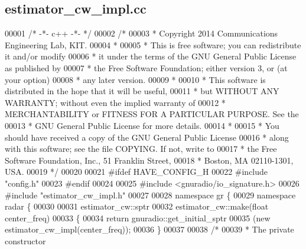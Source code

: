 \subsection{estimator\+\_\+cw\+\_\+impl.\+cc}
\label{estimator__cw__impl_8cc_source}

\begin{DoxyCode}
00001 \textcolor{comment}{/* -*- c++ -*- */}
00002 \textcolor{comment}{/* }
00003 \textcolor{comment}{ * Copyright 2014 Communications Engineering Lab, KIT.}
00004 \textcolor{comment}{ * }
00005 \textcolor{comment}{ * This is free software; you can redistribute it and/or modify}
00006 \textcolor{comment}{ * it under the terms of the GNU General Public License as published by}
00007 \textcolor{comment}{ * the Free Software Foundation; either version 3, or (at your option)}
00008 \textcolor{comment}{ * any later version.}
00009 \textcolor{comment}{ * }
00010 \textcolor{comment}{ * This software is distributed in the hope that it will be useful,}
00011 \textcolor{comment}{ * but WITHOUT ANY WARRANTY; without even the implied warranty of}
00012 \textcolor{comment}{ * MERCHANTABILITY or FITNESS FOR A PARTICULAR PURPOSE.  See the}
00013 \textcolor{comment}{ * GNU General Public License for more details.}
00014 \textcolor{comment}{ * }
00015 \textcolor{comment}{ * You should have received a copy of the GNU General Public License}
00016 \textcolor{comment}{ * along with this software; see the file COPYING.  If not, write to}
00017 \textcolor{comment}{ * the Free Software Foundation, Inc., 51 Franklin Street,}
00018 \textcolor{comment}{ * Boston, MA 02110-1301, USA.}
00019 \textcolor{comment}{ */}
00020  
00021 \textcolor{preprocessor}{#ifdef HAVE\_CONFIG\_H}
00022 \textcolor{preprocessor}{#include "config.h"}
00023 \textcolor{preprocessor}{#endif}
00024 
00025 \textcolor{preprocessor}{#include <gnuradio/io\_signature.h>}
00026 \textcolor{preprocessor}{#include "estimator_cw_impl.h"}
00027 
00028 \textcolor{keyword}{namespace }gr \{
00029   \textcolor{keyword}{namespace }radar \{
00030 
00031     estimator_cw::sptr
00032     estimator_cw::make(\textcolor{keywordtype}{float} center_freq)
00033     \{
00034       \textcolor{keywordflow}{return} gnuradio::get\_initial\_sptr
00035         (\textcolor{keyword}{new} estimator_cw_impl(center\_freq));
00036     \}
00037 
00038     \textcolor{comment}{/*}
00039 \textcolor{comment}{     * The private constructor}

\end{DoxyCode}
